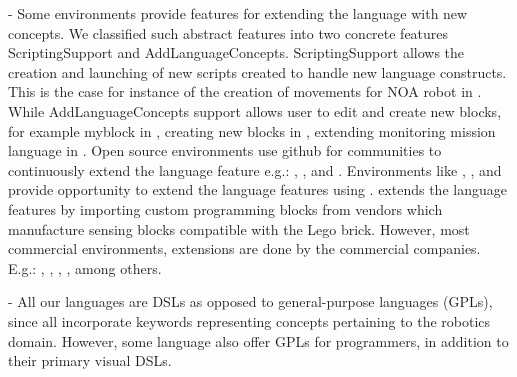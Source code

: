 \parhead{\fextensibility} -
Some environments provide features for extending the language with new concepts. We classified such abstract features into two concrete features ScriptingSupport and AddLanguageConcepts. %
ScriptingSupport allows the creation and launching of new scripts created to handle new language constructs. This is the case for instance of the creation of  movements for NOA robot in \choregraphe.
 While AddLanguageConcepts support allows user to edit and create new blocks, for example myblock in \makeblock, creating new blocks in \tivipe, extending monitoring mission language in \flyaq.   Open source environments use github for communities to continuously extend the language feature e.g.: \sphero, \openroberta, and \flyaq. Environments like \easyc, \flyaq, and \missionlab provide opportunity to extend the language features using .    
\lego extends the language features by importing custom programming blocks from vendors which manufacture sensing blocks compatible with the Lego brick. However, most commercial environments, extensions  are done by the commercial companies. E.g.: \arcbotics, \edison, \blocklyprop, \vex, \robotmesh among others.

\parhead{\flangparadigm} - All our languages are DSLs as opposed to general-purpose languages (GPLs), since all incorporate keywords representing concepts pertaining to the robotics domain. However, some language also offer GPLs for programmers, in addition to their primary visual DSLs.


